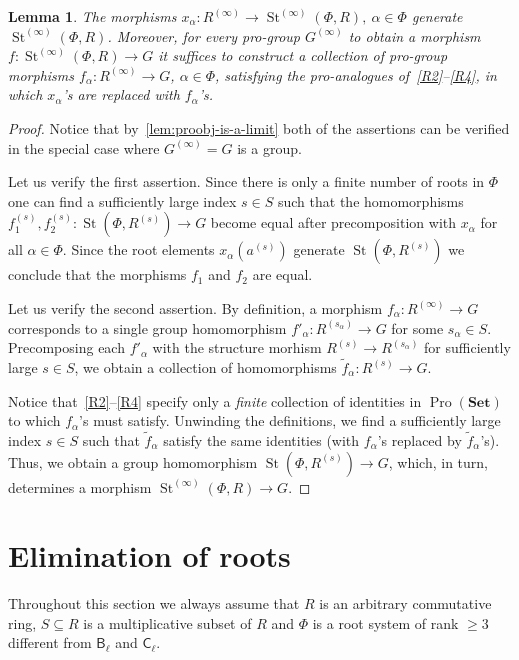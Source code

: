 \documentclass[oneside, 11pt]{amsart}
\numberwithin{equation}{section}
\newtheorem{lemma}{Lemma} \numberwithin{lemma}{section}
\theoremstyle{definition}
\theoremstyle{remark}
\DeclareMathOperator\St{St}
\DeclareMathOperator{\Pro}{Pro}
\newcommand{\Set}{\mathbf{Set}}
\newcommand{\rB}{\mathsf{B}}
\newcommand{\rC}{\mathsf{C}}
\begin{document}
\begin{lemma}\label{SteinbergPresentation}
The morphisms $x_{\alpha} \colon R^{(\infty)} \to \St^{(\infty)}(\Phi, R), \ \alpha\in \Phi$ generate $\St^{(\infty)}(\Phi, R)$. Moreover, for every pro-group $G^{(\infty)}$ to obtain a morphism $f \colon \St^{(\infty)}(\Phi, R) \to G$ it suffices to construct a collection of pro-group morphisms \(f_{\alpha} \colon R^{(\infty)} \to G\), $\alpha\in\Phi$, satisfying the pro-analogues of~\eqref{R2}--\eqref{R4}, in which $x_\alpha$'s are replaced with $f_{\alpha}$'s.
\end{lemma}
\begin{proof}
Notice that by~\cref{lem:proobj-is-a-limit} both of the assertions can be verified in the special case where $G^{(\infty)} = G$ is a group.

Let us verify the first assertion. Since there is only a finite number of roots in $\Phi$ one can find a sufficiently large index $s \in S$ such that the homomorphisms $f_1^{(s)}, f_2^{(s)}\colon \St(\Phi, R^{(s)}) \to G$ become equal after precomposition with $x_\alpha$ for all $\alpha \in \Phi$.
Since the root elements $x_\alpha(a^{(s)})$ generate $\St(\Phi, R^{(s)})$ we conclude that the morphisms $f_1$ and $f_2$ are equal.

Let us verify the second assertion. By definition, a morphism $f_\alpha \colon R^{(\infty)} \to G$ corresponds to a single group homomorphism 
 $f'_\alpha \colon R^{(s_\alpha)} \to G$ for some $s_\alpha \in S$. Precomposing each $f'_\alpha$ with the structure morhism $R^{(s)} \to R^{(s_\alpha)}$ for sufficiently large $s \in S$, we obtain a collection of homomorphisms $\widetilde{f}_\alpha \colon R^{(s)} \to G$.
 
Notice that~\eqref{R2}--\eqref{R4} specify only a {\it finite} collection of identities in $\Pro(\Set)$ to which $f_\alpha$'s must satisfy.
Unwinding the definitions, we find a sufficiently large index $s \in S$ such that $\widetilde{f}_\alpha$ satisfy the same identities (with $f_\alpha$'s replaced by $\widetilde{f}_\alpha$'s).
Thus, we obtain a group homomorphism $\St(\Phi, R^{(s)}) \to G$, which, in turn, determines a morphism $\St^{(\infty)}(\Phi, R) \to G$.
\end{proof}

\section{Elimination of roots}
Throughout this section we always assume that \(R\) is an arbitrary commutative ring,
 \(S \subseteq R\) is a multiplicative subset of $R$ and \(\Phi\) is a root system of rank \(\geq 3\) different from \(\rB_\ell\) and \(\rC_\ell\). 
\end{document}
